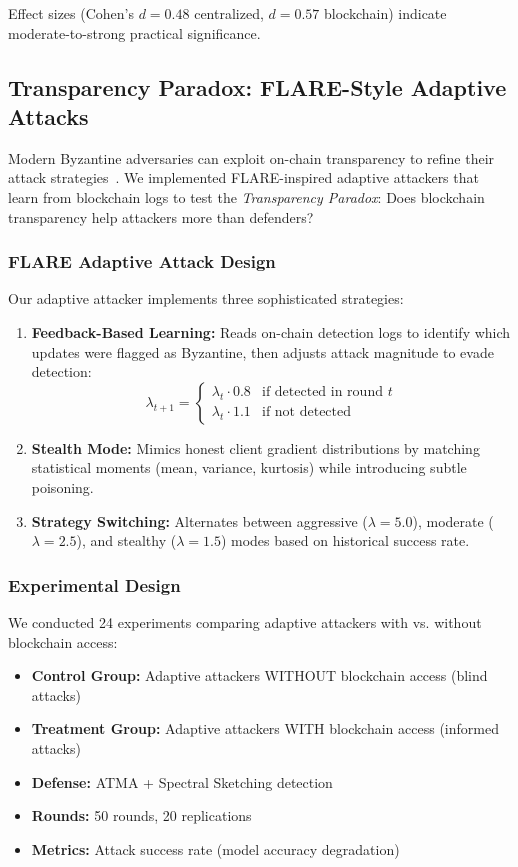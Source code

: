 \documentclass{ieeeaccess}
\begin{document}
Effect sizes (Cohen's $d=0.48$ centralized, $d=0.57$ blockchain) indicate moderate-to-strong practical significance.

\subsection{Transparency Paradox: FLARE-Style Adaptive Attacks}

Modern Byzantine adversaries can exploit on-chain transparency to refine their attack strategies~\cite{baruch2019little}. We implemented FLARE-inspired adaptive attackers that learn from blockchain logs to test the \emph{Transparency Paradox}: Does blockchain transparency help attackers more than defenders?

\subsubsection{FLARE Adaptive Attack Design}

Our adaptive attacker implements three sophisticated strategies:

\begin{enumerate}
    \item \textbf{Feedback-Based Learning:} Reads on-chain detection logs to identify which updates were flagged as Byzantine, then adjusts attack magnitude to evade detection:
    $$\lambda_{t+1} = \begin{cases}
    \lambda_t \cdot 0.8 & \text{if detected in round } t \\
    \lambda_t \cdot 1.1 & \text{if not detected}
    \end{cases}$$
    
    \item \textbf{Stealth Mode:} Mimics honest client gradient distributions by matching statistical moments (mean, variance, kurtosis) while introducing subtle poisoning.
    
    \item \textbf{Strategy Switching:} Alternates between aggressive ($\lambda=5.0$), moderate ($\lambda=2.5$), and stealthy ($\lambda=1.5$) modes based on historical success rate.
\end{enumerate}

\subsubsection{Experimental Design}

We conducted 24 experiments comparing adaptive attackers with vs. without blockchain access:
\begin{itemize}
    \item \textbf{Control Group:} Adaptive attackers WITHOUT blockchain access (blind attacks)
    \item \textbf{Treatment Group:} Adaptive attackers WITH blockchain access (informed attacks)
    \item \textbf{Defense:} ATMA + Spectral Sketching detection
    \item \textbf{Rounds:} 50 rounds, 20 replications
    \item \textbf{Metrics:} Attack success rate (model accuracy degradation)
\end{itemize}
\end{document}
